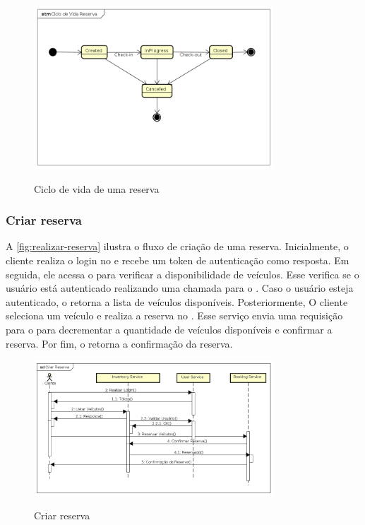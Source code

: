 \begin{figure}[H]
    \centering
    \caption{Ciclo de vida de uma reserva}
    \includegraphics[width=0.8\textwidth]{media/ciclo-reserva.png}
    \label{fig:ciclo-reserva}
\end{figure}

\subsubsection{Criar reserva}
A \autoref{fig:realizar-reserva} ilustra o fluxo de criação de uma reserva. Inicialmente, o cliente realiza o login no  e recebe um token de autenticação como resposta. Em seguida, ele acessa o  para verificar a disponibilidade de veículos. Esse verifica se o usuário está autenticado realizando uma chamada para o . Caso o usuário esteja autenticado, o  retorna a lista de veículos disponíveis. Posteriormente, O cliente seleciona um veículo e realiza a reserva no . Esse serviço envia uma requisição para o  para decrementar a quantidade de veículos disponíveis e confirmar a reserva. Por fim, o  retorna a confirmação da reserva.

\begin{figure}[H]
    \centering
    \caption{Criar reserva}
    \includegraphics[width=0.8\textwidth]{media/criar-reserva.png}
    \label{fig:realizar-reserva}
\end{figure}

